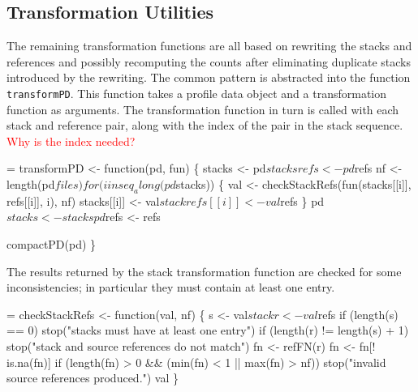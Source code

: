 \documentclass[11pt]{article}
\newcommand{\FIXME}[1]{\textcolor{red}{#1}}
\begin{document}
\subsection{Transformation Utilities}
The remaining transformation functions are all based on rewriting the
stacks and references and possibly recomputing the counts after
eliminating duplicate stacks introduced by the rewriting. The common
pattern is abstracted into the function \Verb!transformPD!. This function
takes a profile data object and a transformation function as
arguments. The transformation function in turn is called with each
stack and reference pair, along with the index of the pair in the
stack sequence.
\FIXME{Why is the index needed?}
\begin{nwchunk}
=
 transformPD <- function(pd, fun) \{
     stacks <- pd$stacks
     refs <- pd$refs
     nf <- length(pd$files)
     for (i in seq_along(pd$stacks)) \{
         val <- checkStackRefs(fun(stacks[[i]], refs[[i]], i), nf)
         stacks[[i]] <- val$stack
         refs[[i]] <- val$refs
     \}
     pd$stacks <- stacks
     pd$refs <- refs
 
     compactPD(pd)
 \}
\end{nwchunk}

The results returned by the stack transformation function are checked
for some inconsistencies; in particular they must contain at least one
entry.
\begin{nwchunk}
=
 checkStackRefs <- function(val, nf) \{
     s <- val$stack
     r <- val$refs
     if (length(s) == 0)
         stop("stacks must have at least one entry")
     if (length(r) != length(s) + 1)
         stop("stack and source references do not match")
     fn <- refFN(r)
     fn <- fn[! is.na(fn)]
     if (length(fn) > 0 && (min(fn) < 1 || max(fn) > nf))
         stop("invalid source references produced.")
     val
 \}
\end{nwchunk}
\end{document}
